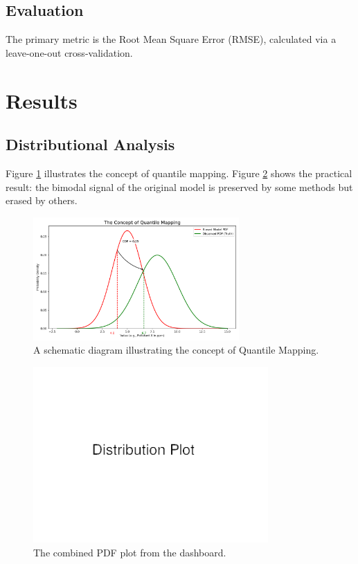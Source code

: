 \documentclass[11pt, a4paper]{article}
\begin{document}
\subsection{Evaluation}
The primary metric is the Root Mean Square Error (RMSE), calculated via a leave-one-out cross-validation.

\section{Results}

\subsection{Distributional Analysis}
Figure \ref{fig:qm_schematic} illustrates the concept of quantile mapping. Figure \ref{fig:dist} shows the practical result: the bimodal signal of the original model is preserved by some methods but erased by others.

\begin{figure}[h!]
\centering
\includegraphics[width=0.7\textwidth]{qm_schematic.png}
\caption{A schematic diagram illustrating the concept of Quantile Mapping.}
\label{fig:qm_schematic}
\end{figure}

\begin{figure}[h!]
\centering
\includegraphics[width=0.8\textwidth]{web/screenshot_dist.png}
\caption{The combined PDF plot from the dashboard.}
\label{fig:dist}
\end{figure}
\end{document}
